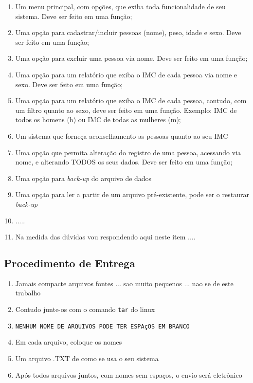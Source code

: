 \documentclass[12pt,a4paper]{article}
\begin{document}
\begin{enumerate}
  \item Um menu principal, com opções, que exiba toda funcionalidade de seu sistema. Deve ser feito em uma função;
  \item Uma opção para cadastrar/incluir pessoas (nome), peso, idade e sexo. Deve ser feito em uma função;
  \item Uma opção para excluir uma pessoa via nome. Deve  ser feito em uma função;

  \item Uma opção para um relatório que exiba o IMC de cada  pessoa via nome e sexo. Deve ser feito em uma função;
  
  \item Uma opção para um relatório que exiba o IMC de cada  pessoa, contudo, com um filtro quanto ao  sexo, deve ser feito em uma função. Exemplo: IMC de todos os homens (h) ou IMC de todas as mulheres (m);
  
  \item Um sistema que forneça aconselhamento as pessoas quanto ao seu IMC
  
   
  \item Uma opção que permita alteração do registro de  uma pessoa, acessando  via nome,
  e alterando TODOS os seus dados. Deve  ser feito em uma função;
  
  
  \item Uma opção para \textit{back-up} do arquivo de dados
  
  \item Uma opção para ler a partir de um arquivo pré-existente, pode ser o restaurar 
   \textit{back-up}
   
   \item .....
   
 \item Na  medida das dúvidas vou respondendo aqui neste item ....
  
\end{enumerate}




\subsection{Procedimento de Entrega}


\begin{enumerate}
  \item Jamais compacte arquivos fontes ... sao muito pequenos ... nao se de este trabalho
  \item Contudo junte-os com o comando \texttt{tar} do linux
    \item \texttt{NENHUM NOME DE ARQUIVOS PODE TER ESPAçOS EM BRANCO}
    \item Em cada arquivo, coloque os nomes
    \item Um arquivo .TXT de como se usa o seu sistema
    \item Após todos arquivos juntos, com nomes sem espaços, o envio será eletrônico
    
\end{enumerate}
\end{document}
